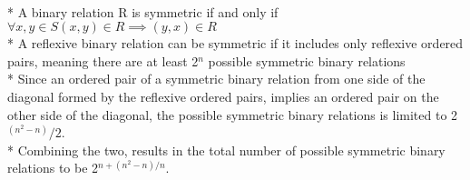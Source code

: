 \documentclass[12pt]{article}
\begin{document}
\medskip
\\* A binary relation R is symmetric if and only if $\forall x,y \in S (x, y) \in R \implies (y,x) \in R$
\\* A reflexive binary relation can be symmetric if it includes only reflexive ordered pairs, meaning there are at least 2$^n$ possible symmetric binary relations
\\* Since an ordered pair of a symmetric binary relation from one side of the diagonal formed by the reflexive ordered pairs, implies an ordered pair on the other side of the diagonal, the possible symmetric binary relations is limited to 2$^(n^2 - n)/2$.
\\* Combining the two, results in the total number of possible symmetric binary relations to be 2$^{n+(n^2-n)/n}$.
\end{document}
